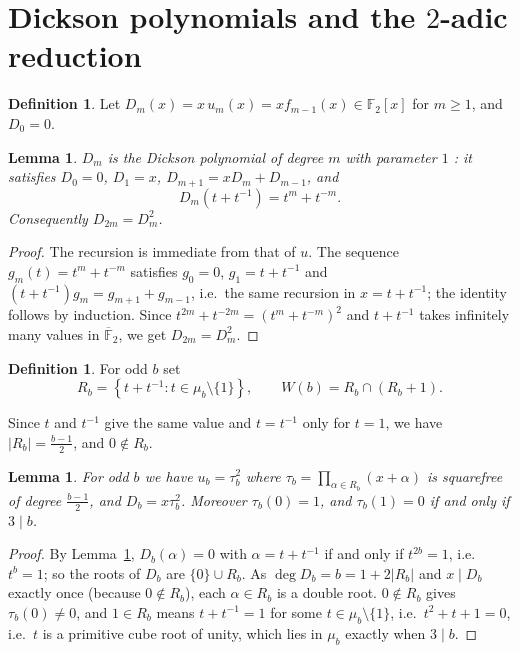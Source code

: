 \documentclass[a4paper]{article}
\newtheorem{lemma}[theorem]{Lemma}
\theoremstyle{definition}
\newtheorem{definition}[theorem]{Definition}
\newcommand{\F}{\mathbb{F}}
\newcommand{\abs}[1]{\left| #1 \right|}
\begin{document}
	\section{Dickson polynomials and the $2$-adic reduction}\label{sec:dickson}
	\begin{definition}
		Let $D_m(x) = x\, u_m(x) = x f_{m-1}(x) \in \F_2[x]$ for $m \geq 1$, and $D_0 = 0$.
	\end{definition}

	\begin{lemma}\label{lem:dickson}
		$D_m$ is the Dickson polynomial of degree $m$ with parameter $1$ \cite{LidlMullenTurnwald1993}: it satisfies $D_0 = 0$, $D_1 = x$, $D_{m+1} = x D_m + D_{m-1}$, and
		\begin{equation*}
			D_m\!\left(t + t^{-1}\right) = t^m + t^{-m}.
		\end{equation*}
		Consequently $D_{2m} = D_m^2$.
	\end{lemma}
	\begin{proof}
		The recursion is immediate from that of $u$.
		The sequence $g_m(t) = t^m + t^{-m}$ satisfies $g_0 = 0$, $g_1 = t + t^{-1}$ and $(t + t^{-1}) g_m = g_{m+1} + g_{m-1}$, i.e.\ the same recursion in $x = t + t^{-1}$; the identity follows by induction.
		Since $t^{2m} + t^{-2m} = (t^m + t^{-m})^2$ and $t + t^{-1}$ takes infinitely many values in $\overline{\F}_2$, we get $D_{2m} = D_m^2$.
	\end{proof}

	\begin{definition}
		For odd $b$ set
		\begin{equation*}
			R_b = \left\{ t + t^{-1} : t \in \mu_b \setminus \{1\} \right\},
			\qquad
			W(b) = R_b \cap (R_b + 1) .
		\end{equation*}
	\end{definition}
	Since $t$ and $t^{-1}$ give the same value and $t = t^{-1}$ only for $t = 1$, we have $\abs{R_b} = \frac{b-1}{2}$, and $0 \notin R_b$.

	\begin{lemma}\label{lem:tau}
		For odd $b$ we have $u_b = \tau_b^2$ where $\tau_b = \prod_{\alpha \in R_b}(x + \alpha)$ is squarefree of degree $\frac{b-1}{2}$, and $D_b = x \tau_b^2$.
		Moreover $\tau_b(0) = 1$, and $\tau_b(1) = 0$ if and only if $3 \mid b$.
	\end{lemma}
	\begin{proof}
		By Lemma~\ref{lem:dickson}, $D_b(\alpha) = 0$ with $\alpha = t + t^{-1}$ if and only if $t^{2b} = 1$, i.e.\ $t^b = 1$; so the roots of $D_b$ are $\{0\} \cup R_b$.
		As $\deg D_b = b = 1 + 2\abs{R_b}$ and $x \mid D_b$ exactly once (because $0 \notin R_b$), each $\alpha \in R_b$ is a double root.
		$0 \notin R_b$ gives $\tau_b(0) \ne 0$, and $1 \in R_b$ means $t + t^{-1} = 1$ for some $t \in \mu_b \setminus \{1\}$, i.e.\ $t^2 + t + 1 = 0$, i.e.\ $t$ is a primitive cube root of unity, which lies in $\mu_b$ exactly when $3 \mid b$.
	\end{proof}
\end{document}
